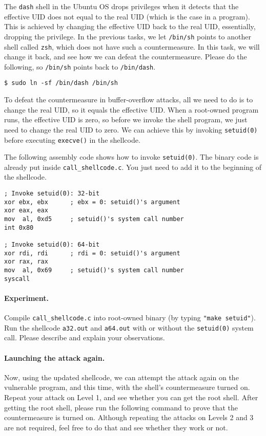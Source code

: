 The \texttt{dash} shell in the Ubuntu OS 
drops privileges when it detects that the effective UID does not 
equal to the real UID (which is the case in a \setuid program). 
This is achieved by changing the 
effective UID back to the real UID, essentially, dropping the 
privilege.  In the previous tasks, we let \texttt{/bin/sh} points
to another shell called \texttt{zsh}, which does not have such
a countermeasure. In this task, we will change it back, 
and see how we can defeat the countermeasure. Please 
do the following, so \texttt{/bin/sh} points back to 
\texttt{/bin/dash}. 


\begin{lstlisting}
$ sudo ln -sf /bin/dash /bin/sh
\end{lstlisting}

To defeat the countermeasure in buffer-overflow attacks,
all we need to do is to change the real UID, so it equals the 
effective UID. When a root-owned \setuid program runs, the 
effective UID is zero, so before we invoke the shell program,
we just need to change the real UID to zero.
We can achieve this by invoking \texttt{setuid(0)} before executing 
\texttt{execve()} in the shellcode. 

The following assembly code shows how to invoke
\texttt{setuid(0)}. The binary code is already put inside 
\texttt{call\_shellcode.c}. You just need to add it to the 
beginning of the shellcode. 

\begin{lstlisting}[language={[x86masm]Assembler}]
; Invoke setuid(0): 32-bit
xor ebx, ebx      ; ebx = 0: setuid()'s argument
xor eax, eax
mov  al, 0xd5     ; setuid()'s system call number
int 0x80

; Invoke setuid(0): 64-bit
xor rdi, rdi      ; rdi = 0: setuid()'s argument
xor rax, rax       
mov  al, 0x69     ; setuid()'s system call number
syscall
\end{lstlisting}


\paragraph{Experiment.} Compile \texttt{call\_shellcode.c} into
root-owned binary (by typing \texttt{"make setuid"}). 
Run the shellcode \texttt{a32.out} and \texttt{a64.out} with or without 
the \texttt{setuid(0)} system call. Please describe and explain
your observations. 

\paragraph{Launching the attack again.}
Now, using the updated shellcode, we can attempt the attack 
again on the vulnerable program, and this time, with the 
shell's countermeasure turned on. Repeat your attack
on Level 1, and see whether 
you can get the root shell. After getting the root shell,
please run the following command to prove that the countermeasure
is turned on. Although repeating the attacks on Levels 2 and 3 
are not required, feel free to do that and see whether they work or not.

